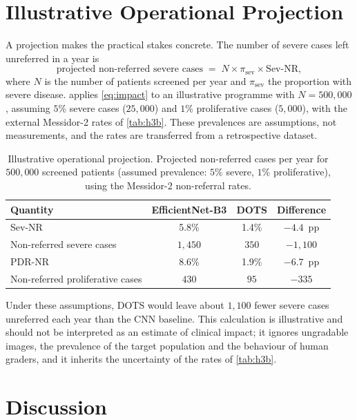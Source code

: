 \section{Illustrative Operational Projection}
\label{sec:impact}

A projection makes the practical stakes concrete. The number of severe cases left
unreferred in a year is
\begin{equation}
\text{projected non-referred severe cases} \;=\; N\times\pi_{\mathrm{sev}}\times\text{Sev-NR},
\label{eq:impact}
\end{equation}
where $N$ is the number of patients screened per year and $\pi_{\mathrm{sev}}$ the
proportion with severe disease.  applies \cref{eq:impact} to an
illustrative programme with $N=500{,}000$, assuming $5\%$ severe cases ($25{,}000$) and $1\%$
proliferative cases ($5{,}000$), with the external Messidor-2 rates of \cref{tab:h3b}. These
prevalences are assumptions, not measurements, and the rates are transferred from a
retrospective dataset.

\begin{table}[!htbp]
\centering
\caption[Illustrative operational projection]{Illustrative operational projection. Projected non-referred cases per year for $500{,}000$
screened patients (assumed prevalence: $5\%$ severe, $1\%$ proliferative), using the
Messidor-2 non-referral rates.}
\label{tab:impact}
\small
\begin{tabular}{@{}lccc@{}}
\toprule
Quantity & EfficientNet-B3 & DOTS & Difference \\
\midrule
Sev-NR & 5.8\% & 1.4\% & $-4.4$~pp \\
Non-referred severe cases & $1{,}450$ & $350$ & $-1{,}100$ \\
PDR-NR & 8.6\% & 1.9\% & $-6.7$~pp \\
Non-referred proliferative cases & $430$ & $95$ & $-335$ \\
\bottomrule
\end{tabular}
\end{table}

Under these assumptions, DOTS would leave about $1{,}100$ fewer severe cases unreferred each
year than the CNN baseline. This calculation is illustrative and should not be interpreted as an estimate of
clinical impact; it
ignores ungradable images, the prevalence of the target population and the behaviour of
human graders, and it inherits the uncertainty of the rates of \cref{tab:h3b}.

\section{Discussion}
\label{sec:ch4-discussion}

